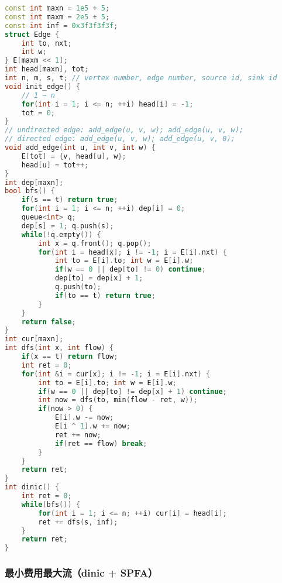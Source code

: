 \begin{lstlisting}[language=C++]
const int maxn = 1e5 + 5;
const int maxm = 2e5 + 5;
const int inf = 0x3f3f3f3f;
struct Edge {
    int to, nxt;
    int w;
} E[maxm << 1];
int head[maxn], tot;
int n, m, s, t; // vertex number, edge number, source id, sink id
void init_edge() {
    // 1 ~ n
    for(int i = 1; i <= n; ++i) head[i] = -1;
    tot = 0;
}
// undirected edge: add_edge(u, v, w); add_edge(u, v, w);
// directed edge: add_edge(u, v, w); add_edge(u, v, 0);
void add_edge(int u, int v, int w) {
    E[tot] = {v, head[u], w};
    head[u] = tot++;
}
int dep[maxn];
bool bfs() {
    if(s == t) return true;
    for(int i = 1; i <= n; ++i) dep[i] = 0;
    queue<int> q;
    dep[s] = 1; q.push(s);
    while(!q.empty()) {
        int x = q.front(); q.pop();
        for(int i = head[x]; i != -1; i = E[i].nxt) {
            int to = E[i].to; int w = E[i].w;
            if(w == 0 || dep[to] != 0) continue;
            dep[to] = dep[x] + 1;
            q.push(to);
            if(to == t) return true;
        }
    }
    return false;
}
int cur[maxn];
int dfs(int x, int flow) {
    if(x == t) return flow;
    int ret = 0;
    for(int &i = cur[x]; i != -1; i = E[i].nxt) {
        int to = E[i].to; int w = E[i].w;
        if(w == 0 || dep[to] != dep[x] + 1) continue;
        int now = dfs(to, min(flow - ret, w));
        if(now > 0) {
            E[i].w -= now;
            E[i ^ 1].w += now;
            ret += now;
            if(ret == flow) break;
        }
    }
    return ret;
}
int dinic() {
    int ret = 0;
    while(bfs()) {
        for(int i = 1; i <= n; ++i) cur[i] = head[i];
        ret += dfs(s, inf);
    }
    return ret;
}
\end{lstlisting}

\subsubsection{最小费用最大流（dinic + SPFA）}

